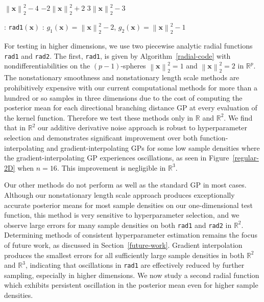 \documentclass{article}
\newcommand{\norm}[1]{\left\lVert#1\right\rVert}
\renewcommand{\vec}[1]{\mathbf{#1}}
\newcommand{\R}{\mathbb{R}}
\numberwithin{equation}{section}
\begin{document}
\begin{algorithm}[H]
    \captionsetup{justification=centering}
    \begin{algorithmic}
    \IF{$g_1(\vec{x}) \geq 0$}
        \RETURN $\norm{\vec{x}}_2^2 - 4$
    \ELSIF{$g_2(\vec{x}) \geq 0$}
        \RETURN $-2\norm{\vec{x}}_2^2 + 2$
    \ELSE
        \RETURN $3\norm{\vec{x}}_2^2 - 3$
    \ENDIF
    \end{algorithmic}
    \caption{: \texttt{rad1}$(\vec{x})$ : $g_1(\vec{x}) = \norm{\vec{x}}_2^2 - 2$, $g_2(\vec{x}) = \norm{\vec{x}}_2^2 - 1$}
	\label{radial-code}
\end{algorithm}

For testing in higher dimensions, we use two piecewise analytic radial functions \texttt{rad1} and \texttt{rad2}. The first, \texttt{rad1}, is given by Algorithm~\ref{radial-code} with nondifferentiabilities on the $(p-1)$-spheres $\norm{\vec{x}}_2^2 = 1$ and $\norm{\vec{x}}_2^2 = 2$ in $\R^p$. The nonstationary smoothness and nonstationary length scale methods are prohibitively expensive with our current computational methods for more than a hundred or so samples in three dimensions due to the cost of computing the posterior mean for each directional branching distance GP at every evaluation of the kernel function. Therefore we test these methods only in $\R$ and $\R^2$.
We find that in $\R^2$ our additive derivative noise approach is robust to hyperparameter selection and demonstrates significant improvement over both function-interpolating and gradient-interpolating GPs for some low sample densities where the gradient-interpolating GP experiences oscillations, as seen in Figure~\ref{regular-2D} when $n=16$. This improvement is negligible in $\R^3$.

Our other methods do not perform as well as the standard GP in most cases. Although our nonstationary length scale approach produces exceptionally accurate posterior means for most sample densities on our one-dimensional test function, this method is very sensitive to hyperparameter selection, and we observe large errors for many sample densities on both \texttt{rad1} and \texttt{rad2} in $\R^2$. Determining methods of consistent hyperparameter estimation remains the focus of future work, as discussed in Section~\ref{future-work}. Gradient interpolation produces the smallest errors for all sufficiently large sample densities in both $\R^2$ and $\R^3$, indicating that oscillations in \texttt{rad1} are effectively reduced by further sampling, especially in higher dimensions. We now study a second radial function which exhibits persistent oscillation in the posterior mean even for higher sample densities.
\end{document}
